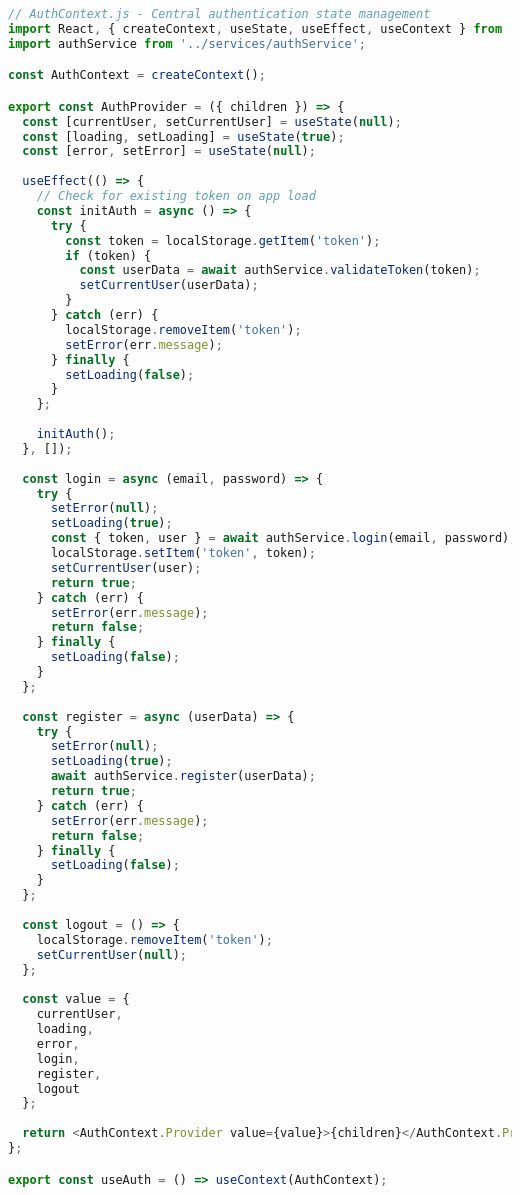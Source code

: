 \documentclass[12pt,a4paper]{article}
\begin{document}
\begin{lstlisting}[language=JavaScript]
// AuthContext.js - Central authentication state management
import React, { createContext, useState, useEffect, useContext } from 'react';
import authService from '../services/authService';

const AuthContext = createContext();

export const AuthProvider = ({ children }) => {
  const [currentUser, setCurrentUser] = useState(null);
  const [loading, setLoading] = useState(true);
  const [error, setError] = useState(null);
  
  useEffect(() => {
    // Check for existing token on app load
    const initAuth = async () => {
      try {
        const token = localStorage.getItem('token');
        if (token) {
          const userData = await authService.validateToken(token);
          setCurrentUser(userData);
        }
      } catch (err) {
        localStorage.removeItem('token');
        setError(err.message);
      } finally {
        setLoading(false);
      }
    };
    
    initAuth();
  }, []);
  
  const login = async (email, password) => {
    try {
      setError(null);
      setLoading(true);
      const { token, user } = await authService.login(email, password);
      localStorage.setItem('token', token);
      setCurrentUser(user);
      return true;
    } catch (err) {
      setError(err.message);
      return false;
    } finally {
      setLoading(false);
    }
  };
  
  const register = async (userData) => {
    try {
      setError(null);
      setLoading(true);
      await authService.register(userData);
      return true;
    } catch (err) {
      setError(err.message);
      return false;
    } finally {
      setLoading(false);
    }
  };
  
  const logout = () => {
    localStorage.removeItem('token');
    setCurrentUser(null);
  };
  
  const value = {
    currentUser,
    loading,
    error,
    login,
    register,
    logout
  };
  
  return <AuthContext.Provider value={value}>{children}</AuthContext.Provider>;
};

export const useAuth = () => useContext(AuthContext);
\end{lstlisting}
\end{document}
